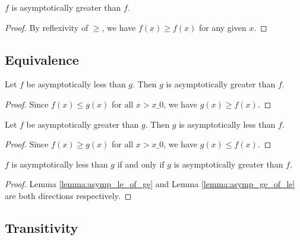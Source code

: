 \begin{lemma}
    \label{lemma:asymp_ge_refl}
    \leanok
    $f$ is asymptotically greater than $f$.
\end{lemma}

\begin{proof}
    \leanok
    By reflexivity of $\ge$, we have $f(x) \ge f(x)$ for any given $x$.
\end{proof}


\subsection{Equivalence}

\begin{lemma}
    \label{lemma:asymp_le_of_ge}
    \leanok
    Let $f$ be asymptotically less than $g$. Then $g$ is asymptotically
    greater than $f$.
\end{lemma}

\begin{proof}
    \leanok
    Since $f(x) \le g(x)$ for all $x > x\_0$, we have $g(x) \ge f(x)$.
\end{proof}

\begin{lemma}
    \label{lemma:asymp_ge_of_le}
    \leanok
    Let $f$ be asymptotically greater than $g$. Then $g$ is asymptotically
    less than $f$.
\end{lemma}

\begin{proof}
    \leanok
    Since $f(x) \ge g(x)$ for all $x > x\_0$, we have $g(x) \le f(x)$.
\end{proof}

\begin{theorem}
    \label{thm:asymp_le_ge_iff}
    \leanok
    $f$ is asymptotically less than $g$ if and only if $g$ is asymptotically
    greater than $f$.
\end{theorem}

\begin{proof}
    \leanok
    Lemma \ref{lemma:asymp_le_of_ge} and Lemma \ref{lemma:asymp_ge_of_le} are both directions
    respectively.
\end{proof}


\subsection{Transitivity}

